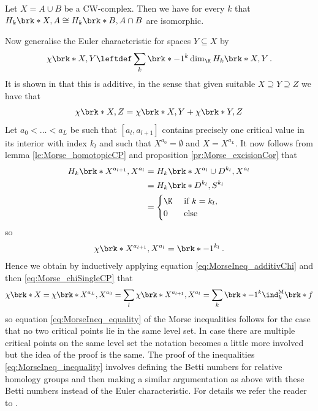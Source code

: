 \begin{proposition}
  \label{pr:Morse_excisionCor}
  Let $X=A\cup B$ be a CW-complex. Then we have for every $k$ that $H_k\brk*{X,A}\cong H_k\brk*{B,A\cap B}$
  are isomorphic.
\end{proposition}
Now generalise the Euler characteristic for spaces $Y\subseteq X$ by
\begin{align}
  \chi\brk*{X,Y}\leftdef \sum_k\brk*{-1}^k\dim_\K H_k\brk*{X,Y}\,.
  \label{eq:Morse_relativeEuler}
\end{align}
It is shown in \cite[§5]{Milnor1963} that this is additive, in the sense that given suitable $X\supseteq Y\supseteq Z$
we have that
\begin{align}
  \chi\brk*{X,Z}=\chi\brk*{X,Y}+\chi\brk*{Y,Z}\label{eq:MorseIneq_additivChi}
\end{align}
Let $a_0<\dots<a_L$ be such that $[a_l,a_{l+1}]$ contains precisely one critical value in its interior with
index $k_l$ and such that $X^{a_0}=\emptyset$ and  $X=X^{a_L}$.
It now follows from lemma \ref{le:Morse_homotopicCP} and proposition \ref{pr:Morse_excisionCor} that
\begin{align*}
  H_k\brk*{X^{a_{l+1}},X^{a_{l}}}
  &=H_k\brk*{X^{a_{l}}\cup D^{k_l},X^{a_{l}}} \\
  &= H_k\brk*{D^{k_l},S^{k_l}} \\
  &=\begin{cases}
    \K &\text{ if }k=k_l,\\
    0 &\text{ else}
  \end{cases}
\end{align*}
so
\begin{align}
  \chi\brk*{X^{a_{l+1}},X^{a_l}}=\brk*{-1}^{k_l}\,.\label{eq:Morse_chiSingleCP}
\end{align}
Hence we obtain by inductively applying equation \eqref{eq:MorseIneq_additivChi}
and then \eqref{eq:Morse_chiSingleCP} that
\begin{align*}
  \chi\brk*{X}=\chi\brk*{X^{a_L},X^{a_0}}=\sum_l \chi\brk*{X^{a_{l+1}},X^{a_l}}
  =\sum_k\brk*{-1}^k\ind^\text{M}_k\brk*{f}
\end{align*}
so equation \eqref{eq:MorseIneq_equality} of the Morse inequalities follows
for the case that no two critical points lie in the same level set.
In case there are multiple critical points on the same level set the notation
becomes a little more involved but the idea of the proof is the same.
The proof of the inequalities \eqref{eq:MorseIneq_inequality} involves defining the
Betti numbers for relative homology groups and then making a similar argumentation
as above with these Betti numbers instead of the Euler characteristic. For details we refer the reader to \cite[§5]{Milnor1963}.


